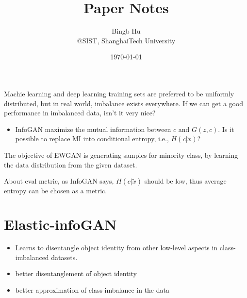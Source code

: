 \documentclass{utils/mydoc}
\title{\bfseries \sffamily Paper Notes}
\author{Bingb Hu \\ @SIST, ShanghaiTech University}
\date{\today}
\begin{document}
\maketitle

Machie learning and deep learning training sets are preferred to be uniformly
distributed, but in real world, imbalance exists everywhere. If we can get a
good performance in imbalanced data, isn't it very nice?

\begin{itemize}
  \item InfoGAN maximize the mutual information between $c$ and $G(z,c)$.
    Is it possible to replace MI into conditional entropy, i.e., 
    $H(c|\tilde{x})$?
\end{itemize}

The objective of EWGAN is generating samples for minority class, by learning
the data distribution from the given dataset.

About eval metric, as InfoGAN says, $H(c|\tilde{x})$ should be low, thus
average entropy can be chosen as a metric.

\section{Elastic-infoGAN}

\begin{itemize}
  \item Learns to disentangle object identity from other low-level aspects in 
    class-imbalanced datasets.
  \item  better disentanglement of object identity
  \item  better approximation of class imbalance in the data
\end{itemize}
\end{document}
